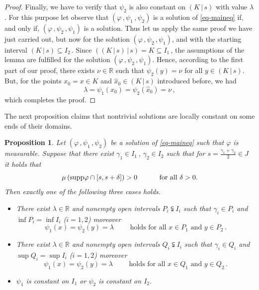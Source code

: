 \documentclass[12pt]{amsart}
\newtheorem{prop}{Proposition}
\theoremstyle{remark}
\theoremstyle{definition}
\newcommand{\RR}{\mathbb{R}}
\newcommand{\supp}{\mbox{\rm supp}}
\newcommand{\rfl}[2]{\left( #1 \, \vert \, #2 \right)}
\begin{document}
\begin{proof}
Finally, we have to verify that 
$ \psi_2 $ is also constant on $ \rfl{K}{s} $ 
with value $ \lambda $. 
For this purpose let observe that 
$ \left( \varphi \,, \psi_1 \,, \psi_2 \right) $ 
is a solution of \eqref{eq-maineq} if, 
and only if, 
$ \left( \varphi \,, \psi_2 \,, \psi_1 \right) $ 
is a solution. 
Thus let us apply the same proof we have just carried out, 
but now for the solution 
$ \left( \varphi \,, \psi_2 \,, \psi_1 \right) $, 
and with the starting interval 
$ \rfl{K}{s} \subseteq I_2 \,$. 
Since 
$ \rfl{\rfl{K}{s}}{s} = K \subseteq I_1 \,$, 
the assumptions of the lemma are fulfilled 
for the solution 
$ \left( \varphi \,, \psi_2 \,, \psi_1 \right) $. 
Hence, according to the first part of our proof, 
there exists $ \nu \in \RR $ such that 
$ \psi_2(y) = \nu $ for all 
$ y \in \rfl{K}{s} $. 
But, for the 
points 
$ x_0 = x \in K $ and 
$ \widehat{x}_0 \in \rfl{K}{s}$ 
introduced before, we had 
\[
\lambda = \psi_1(x_0) = \psi_2(\widehat{x}_0) = \nu \,, 
\]
which completes the proof. 
\end{proof}

The next proposition claims that nontrivial solutions 
are locally constant on some ends of their domains. 

\begin{prop}\label{prop_end_constant}
Let 
$ \left( \varphi \,, \psi_1 \,, \psi_2 \right) $ 
be a solution of \eqref{eq-maineq} such that 
$ \varphi $ is measurable. 
Suppose that there exist 
$ \gamma_1 \in I_1 \,$, 
$ \gamma_2 \in I_2 $ such that for 
$ s = \frac{\gamma_1 + \gamma_2}{2} \in J $ 
it holds that 
\[
\mu \left( \supp \varphi \cap 
\left[ s, s + \delta \right] \right) > 0 
\hspace{10 mm} 
\mbox{ for all } \delta > 0. 
\] 
Then exactly one of the following three cases holds. 
\begin{itemize}
\item[Case 1.] 
There exist $ \lambda \in \RR $ and 
nonempty open intervals 
$ P_i \subsetneqq I_i $ such that 
$ \gamma_i \in P_i $ and $ \inf P_i = \inf I_i $ 
($ i=1,2 $) 
moreover 
\[
\psi_1(x) = \psi_2(y) = \lambda 
\qquad \mbox{ holds for all } 
x \in P_1 \mbox{ and } y \in P_2 \,. 
\]
\item[Case 2.]
There exist $ \lambda \in \RR $ and 
nonempty open intervals 
$ Q_i \subsetneqq I_i $ 
such that 
$ \gamma_i \in Q_i $ and $ \sup Q_i = \sup I_i $ 
($ i=1,2 $) moreover 
\[
\psi_1(x) = \psi_2(y) = \lambda 
\qquad \mbox{ holds for all } 
x \in Q_1 \mbox{ and } y \in Q_2 \,. 
\]
\item[Case 3.]
$ \psi_1 $ is constant on $ I_1 $ or 
$ \psi_2 $ is constant on $ I_2 $. 
\end{itemize}
\end{prop} 
\end{document}

